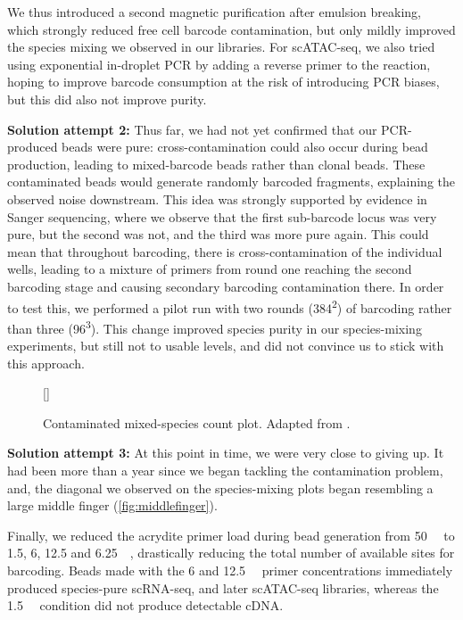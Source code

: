 We thus introduced a second magnetic purification after emulsion breaking, which strongly reduced free cell barcode contamination, but only mildly improved the species mixing we observed in our libraries. For scATAC-seq, we also tried using exponential in-droplet PCR by adding a reverse primer to the reaction, hoping to improve barcode consumption at the risk of introducing PCR biases, but this did also not improve purity.

\textbf{Solution attempt 2:} Thus far, we had not yet confirmed that our PCR-produced beads were pure: cross-contamination could also occur during bead production, leading to mixed-barcode beads rather than clonal beads. These contaminated beads would generate randomly barcoded fragments, explaining the observed noise downstream. This idea was strongly supported by evidence in Sanger sequencing, where we observe that the first sub-barcode locus was very pure, but the second was not, and the third was more pure again. This could mean that throughout barcoding, there is cross-contamination of the individual wells, leading to a mixture of primers from round one reaching the second barcoding stage and causing secondary barcoding contamination there. In order to test this, we performed a pilot run with two rounds (384\textsuperscript{2}) of barcoding rather than three (96\textsuperscript{3}). This change improved species purity in our species-mixing experiments, but still not to usable levels, and did not convince us to stick with this approach.

\begin{figure}
	\centering
	\raisebox{0pt}[\dimexpr{}\baselineskip\relax]{%
		
	}
	\caption[Contaminated mixed-species count plot]{Contaminated mixed-species count plot. Adapted from .}
	\label{fig:middlefinger}
\end{figure}

\textbf{Solution attempt 3:} At this point in time, we were very close to giving up. It had been more than a year since we began tackling the contamination problem, and, the diagonal we observed on the species-mixing plots began resembling a large middle finger (\autoref{fig:middlefinger}).

Finally, we reduced the acrydite primer load during bead generation from \SI{50}{\micro\molar} to \num{1.5}, \num{6}, \num{12.5} and \SI{6.25}{\micro\molar}, drastically reducing the total number of available sites for barcoding. Beads made with the 6 and \SI{12.5}{\micro\molar} primer concentrations immediately produced species-pure scRNA-seq, and later scATAC-seq libraries, whereas the \SI{1.5}{\micro\molar} condition did not produce detectable cDNA.

